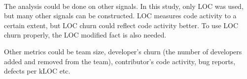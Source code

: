 \paragraph{}
The analysis could be done on other signals. In this study, only LOC was used,
but many other signals can be constructed. LOC measures code activity to a
certain extent, but LOC churn could reflect code activity better. To use LOC
churn properly, the LOC modified fact is also needed.

Other metrics could be team size, developer's churn (the number of developers
added and removed from the team), contributor's code activity, bug reports,
defects per kLOC etc.

\begin{comment}
- Analyse results
- Conclude and interpret results
- Answer hypotheses and research questions
- Threats to validity
- Discussion
- Future work
 
This chapter contains the analysis and interpretation of the results. The
research questions are answered as best as possible given the results that were
obtained. The analysis also discussed parts of the questions that were left
unanswered.

An important topic is the validity of the results.
What methods of validation were used?
Could the results be generalized to other cases?
What threats to validity can be identified?

There is room here to discuss the results of related scientific literature here
as well.
How do the results obtained here relate to other work, and what consequences are
there?
Did your approach work better or worse?
Did you learn anything new compared to the already existing body of knowledge?
Finally, what could you say in hindsight on the research approach by followed?
What could have done better?
What lessons have been learned?
What could other researchers use from your experience?

A separate section should be devoted to ‘future work,’ i.e., possible extension
points of your work that you have identified. Other researchers (or yourself)
could use those as a starting point.

Refer to Chapters 3.7 and 4 in this example thesis at Paul’s
homepage\footnote{http://homepages.cwi.nl/~paulk/thesesMasterSoftwareEngineering/2006/ReneWiegers.pdf}.
\end{comment}
